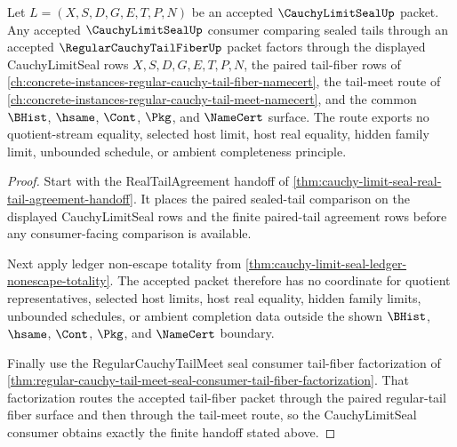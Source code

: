 \begin{theorem}
\label{thm:cauchy-limit-seal-regular-tail-fiber-consumer-boundary}
Let $L=(X,S,D,G,E,T,P,N)$ be an accepted $\CauchyLimitSealUp$ packet. Any
accepted $\CauchyLimitSealUp$ consumer comparing sealed tails through an
accepted $\RegularCauchyTailFiberUp$ packet factors through the displayed
CauchyLimitSeal rows $X,S,D,G,E,T,P,N$, the paired tail-fiber rows of
\autoref{ch:concrete-instances-regular-cauchy-tail-fiber-namecert}, the tail-meet
route of \autoref{ch:concrete-instances-regular-cauchy-tail-meet-namecert}, and the
common $\BHist$, $\hsame$, $\Cont$, $\Pkg$, and $\NameCert$ surface. The route
exports no quotient-stream equality, selected host limit, host real equality,
hidden family limit, unbounded schedule, or ambient completeness principle.
\end{theorem}
\begin{proof}
Start with the RealTailAgreement handoff of
\autoref{thm:cauchy-limit-seal-real-tail-agreement-handoff}. It places the
paired sealed-tail comparison on the displayed CauchyLimitSeal rows and the
finite paired-tail agreement rows before any consumer-facing comparison is
available.

Next apply ledger non-escape totality from
\autoref{thm:cauchy-limit-seal-ledger-nonescape-totality}. The accepted packet
therefore has no coordinate for quotient representatives, selected host limits,
host real equality, hidden family limits, unbounded schedules, or ambient
completion data outside the shown $\BHist$, $\hsame$, $\Cont$, $\Pkg$, and
$\NameCert$ boundary.

Finally use the RegularCauchyTailMeet seal consumer tail-fiber factorization of
\autoref{thm:regular-cauchy-tail-meet-seal-consumer-tail-fiber-factorization}.
That factorization routes the accepted tail-fiber packet through the paired
regular-tail fiber surface and then through the tail-meet route, so the
CauchyLimitSeal consumer obtains exactly the finite handoff stated above.
\end{proof}

